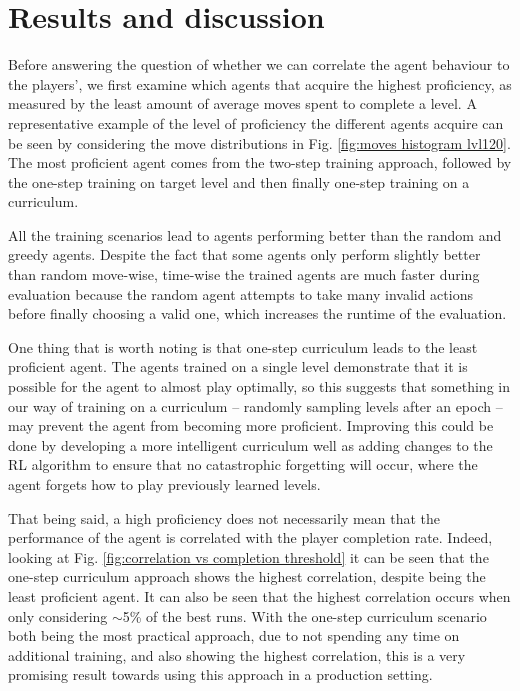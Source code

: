 \documentclass[conference]{IEEEtran}
\begin{document}
\section{Results and discussion}


Before answering the question of whether we can correlate the agent behaviour to the players', we first examine which agents that acquire the highest proficiency, as measured by the least amount of average moves spent to complete a level.
A representative example of the level of proficiency the different agents acquire can be seen by considering the move distributions in Fig. \ref{fig:moves histogram lvl120}.
The most proficient agent comes from the two-step training approach, followed by the one-step training on target level and then finally one-step training on a curriculum.


All the training scenarios lead to agents performing better than the random and greedy agents.
Despite the fact that some agents only perform slightly better than random move-wise, time-wise the trained agents are much faster during evaluation because the random agent attempts to take many invalid actions before finally choosing a valid one, which increases the runtime of the evaluation.

One thing that is worth noting is that one-step curriculum leads to the least proficient agent.
The agents trained on a single level demonstrate that it is possible for the agent to almost play optimally, so this suggests that something in our way of training on a curriculum -- randomly sampling levels after an epoch -- may prevent the agent from becoming more proficient.
Improving this could be done by developing a more intelligent curriculum well as adding changes to the RL algorithm to ensure that no catastrophic forgetting will occur, where the agent forgets how to play previously learned levels.

That being said, a high proficiency does not necessarily mean that the performance of the agent is correlated with the player completion rate.
Indeed, looking at Fig. \ref{fig:correlation vs completion threshold} it can be seen that the one-step curriculum approach shows the highest correlation, despite being the least proficient agent.
It can also be seen that the highest correlation occurs when only considering $\sim$5\% of the best runs.
With the one-step curriculum scenario both being the most practical approach, due to not spending any time on additional training, and also showing the highest correlation, this is a very promising result towards using this approach in a production setting.
\end{document}
